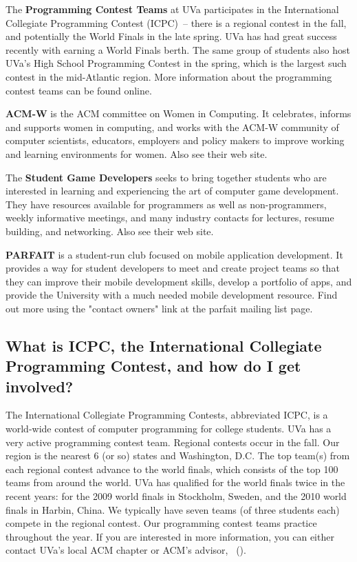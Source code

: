The {\bf Programming Contest Teams} at UVa participates in the
International Collegiate Programming Contest (ICPC)~-- there is a
regional contest in the fall, and potentially the World Finals in the
late spring.  UVa has had great success recently with earning a World
Finals berth.  The same group of students also host UVa's High School
Programming Contest in the spring, which is the largest such contest
in the mid-Atlantic region.  More information about the programming
contest teams can be found
online.

{\bf ACM-W} is the ACM committee on Women in Computing. It celebrates,
informs and supports women in computing, and works with the ACM-W
community of computer scientists, educators, employers and policy
makers to improve working and learning environments for women. Also
see their web site.

The {\bf Student Game Developers} seeks to bring together students who
are interested in learning and experiencing the art of computer game
development. They have resources available for programmers as well as
non-programmers, weekly informative meetings, and many industry
contacts for lectures, resume building, and networking. Also see their
web site.

{\bf PARFAIT} is a student-run club focused on mobile application
development. It provides a way for student developers to meet and
create project teams so that they can improve their mobile development
skills, develop a portfolio of apps, and provide the University with a
much needed mobile development resource. Find out more using the "contact
owners" link at the parfait mailing list
page.

\subsection{What is ICPC, the International Collegiate Programming
  Contest, and how do I get involved?}

The International Collegiate Programming Contests, abbreviated ICPC,
is a world-wide contest of computer programming for college
students. UVa has a very active programming contest team. Regional
contests occur in the fall.  Our region is the nearest 6 (or so)
states and Washington, D.C. The top team(s) from each regional contest
advance to the world finals, which consists of the top 100 teams from
around the world. UVa has qualified for the world finals twice in the
recent years: for the 2009 world finals in Stockholm, Sweden, and the
2010 world finals in Harbin, China. We typically have seven teams (of
three students each) compete in the regional contest. Our programming
contest teams practice throughout the year. If you are interested in
more information, you can either contact UVa's local ACM
chapter or ACM's advisor,
\acmadvisor\ (\acmadvisoremail).

